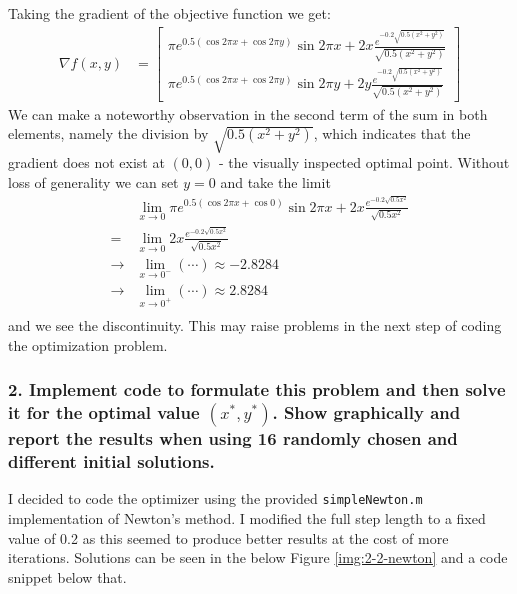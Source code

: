 \documentclass[letterpaper,12pt]{article}
\begin{document}
Taking the gradient of the objective function we get:
\begin{equation}
\begin{aligned}
	\nabla f(x,y) &= \begin{bmatrix}
		\pi e^{0.5(\cos2\pi x + \cos 2\pi y)}\sin 2 \pi x + 2x\frac{e^{-0.2\sqrt{0.5(x^2 + y^2)}}}{\sqrt{0.5(x^2 + y^2)}} \\
		\pi e^{0.5(\cos2\pi x + \cos 2\pi y)}\sin 2 \pi y + 2y\frac{e^{-0.2\sqrt{0.5(x^2 + y^2)}}}{\sqrt{0.5(x^2 + y^2)}}		
	\end{bmatrix} 
\end{aligned}
\end{equation}
We can make a noteworthy observation in the second term of the sum in both elements, namely the division by $\sqrt{0.5(x^2 + y^2)}$, which indicates that the gradient does not exist at $(0,0)$ - the visually inspected optimal point. Without loss of generality we can set $y = 0$ and take the limit
\begin{equation}
\begin{aligned}
	&\lim_{x\rightarrow 0} \pi e^{0.5(\cos2\pi x + \cos 0)}\sin 2\pi x + 2x \frac{e^{-0.2\sqrt{0.5x^2}}}{\sqrt{0.5x^2}} \\
	= &\lim_{x\rightarrow 0} 2x \frac{e^{-0.2\sqrt{0.5x^2}}}{\sqrt{0.5x^2}} \\
	\rightarrow &\lim_{x\rightarrow 0^-} (\cdots) \approx -2.8284 \\
	\rightarrow &\lim_{x\rightarrow 0^+} (\cdots) \approx 2.8284 \\
\end{aligned}
\end{equation}
and we see the discontinuity. This may raise problems in the next step of coding the optimization problem.

\subsubsection*{2. Implement code to formulate this problem and then solve it for the optimal value $(x^*,y^*)$. Show graphically and report the results when using 16 randomly chosen and different initial solutions.}
I decided to code the optimizer using the provided \texttt{simpleNewton.m} implementation of Newton's method. I modified the full step length to a fixed value of 0.2 as this seemed to produce better results at the cost of more iterations. Solutions can be seen in the below Figure \ref{img:2-2-newton} and a code snippet below that.
\end{document}
